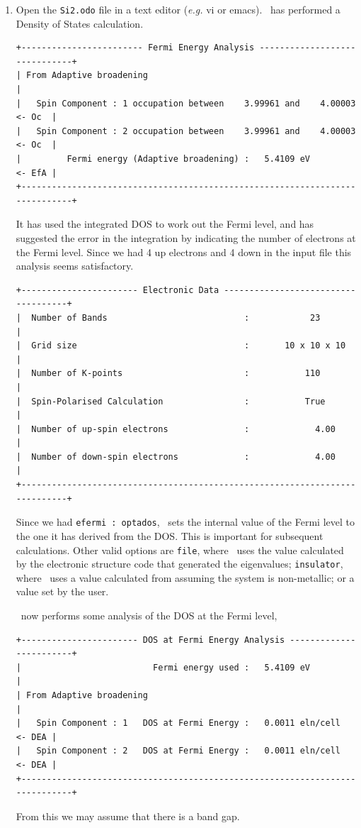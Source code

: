 \documentclass[a4paper,11pt,twoside]{book}
\begin{document}
{\begin{enumerate}
\item Open the \verb#Si2.odo# file in a text editor (\emph{e.g.} vi or emacs).  \optados\ has performed a Density of States calculation.

\begin{verbatim}
+------------------------ Fermi Energy Analysis ------------------------------+
| From Adaptive broadening                                                    |
|   Spin Component : 1 occupation between    3.99961 and    4.00003    <- Oc  |
|   Spin Component : 2 occupation between    3.99961 and    4.00003    <- Oc  |
|         Fermi energy (Adaptive broadening) :   5.4109 eV             <- EfA |
+-----------------------------------------------------------------------------+
\end{verbatim}
It has used the integrated DOS to work out the Fermi level, and has suggested the error in the integration by indicating the number of electrons at the Fermi level. Since we had 4 up electrons and 4 down in the input file this analysis seems satisfactory.
\begin{verbatim}
+----------------------- Electronic Data ------------------------------------+
|  Number of Bands                           :            23                 |
|  Grid size                                 :       10 x 10 x 10            |
|  Number of K-points                        :           110                 |
|  Spin-Polarised Calculation                :           True                |
|  Number of up-spin electrons               :             4.00              |
|  Number of down-spin electrons             :             4.00              |
+----------------------------------------------------------------------------+
\end{verbatim}

Since we had \verb#efermi : optados#, \optados\ sets the internal value of the Fermi level to the one it has derived from the DOS. This is important for subsequent calculations. Other valid options are \verb#file#, where \optados\ uses the value calculated by the electronic structure code that generated the eigenvalues;  \verb#insulator#, where \optados\ uses a value calculated from assuming the system is non-metallic; or a value set by the user.

\optados\ now performs some analysis of the DOS at the Fermi level,
\begin{verbatim}
+----------------------- DOS at Fermi Energy Analysis ------------------------+
|                          Fermi energy used :   5.4109 eV                    |
| From Adaptive broadening                                                    |
|   Spin Component : 1   DOS at Fermi Energy :   0.0011 eln/cell       <- DEA |
|   Spin Component : 2   DOS at Fermi Energy :   0.0011 eln/cell       <- DEA |
+-----------------------------------------------------------------------------+
\end{verbatim}
From this we may assume that there is a band gap.


\end{enumerate}}
\end{document}
